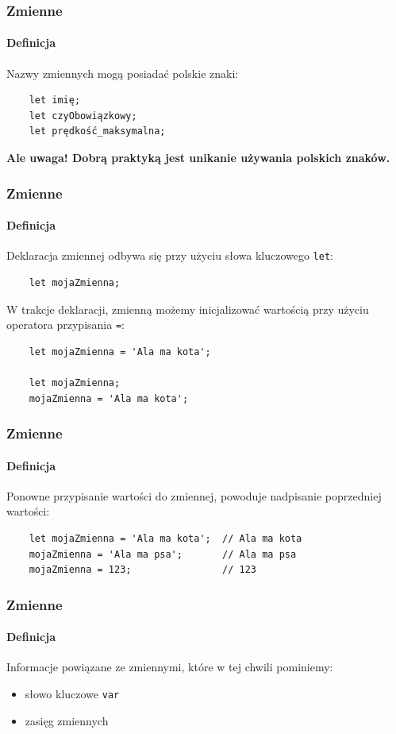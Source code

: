\begin{frame}[fragile]
  \frametitle{Zmienne}
  \framesubtitle{Definicja}

  Nazwy zmiennych mogą posiadać polskie znaki:

  \begin{verbatim}
    let imię;
    let czyObowiązkowy;
    let prędkość_maksymalna;
  \end{verbatim}

  \textbf{Ale uwaga! Dobrą praktyką jest unikanie używania polskich znaków.}
\end{frame}


\begin{frame}[fragile]
  \frametitle{Zmienne}
  \framesubtitle{Definicja}

  Deklaracja zmiennej odbywa się przy użyciu słowa kluczowego \verb|let|:

  \begin{verbatim}
    let mojaZmienna;
  \end{verbatim}

  W trakcje deklaracji, zmienną możemy inicjalizować wartością przy użyciu operatora przypisania \verb|=|:

  \begin{verbatim}
    let mojaZmienna = 'Ala ma kota';

    let mojaZmienna;
    mojaZmienna = 'Ala ma kota';
  \end{verbatim}
\end{frame}


\begin{frame}[fragile]
  \frametitle{Zmienne}
  \framesubtitle{Definicja}

  Ponowne przypisanie wartości do zmiennej, powoduje nadpisanie poprzedniej wartości:

  \begin{verbatim}
    let mojaZmienna = 'Ala ma kota';  // Ala ma kota
    mojaZmienna = 'Ala ma psa';       // Ala ma psa
    mojaZmienna = 123;                // 123
  \end{verbatim}

\end{frame}


\begin{frame}[fragile]
  \frametitle{Zmienne}
  \framesubtitle{Definicja}

  Informacje powiązane ze zmiennymi, które w tej chwili pominiemy:

  \begin{itemize}
      \item słowo kluczowe \verb|var|
      \item zasięg zmiennych
  \end{itemize}
\end{frame}


